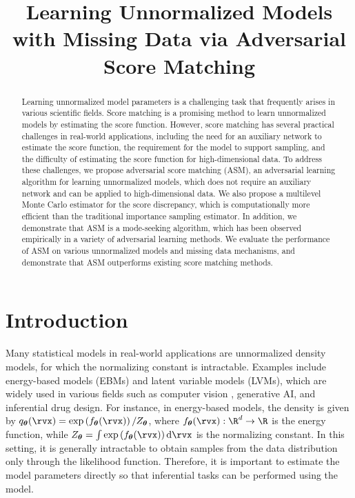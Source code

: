 \documentclass{article} %
\title{Learning Unnormalized Models with Missing Data via Adversarial Score Matching}
\begin{document}
\maketitle

\begin{abstract}
Learning unnormalized model parameters is a challenging task that frequently arises in various scientific fields. Score matching is a promising method to learn unnormalized models by estimating the score function. However, score matching has several practical challenges in real-world applications, including the need for an auxiliary network to estimate the score function, the requirement for the model to support sampling, and the difficulty of estimating the score function for high-dimensional data. To address these challenges, we propose adversarial score matching (ASM), an adversarial learning algorithm for learning unnormalized models, which does not require an auxiliary network and can be applied to high-dimensional data. We also propose a multilevel Monte Carlo estimator for the score discrepancy, which is computationally more efficient than the traditional importance sampling estimator. In addition, we demonstrate that ASM is a mode-seeking algorithm, which has been observed empirically in a variety of adversarial learning methods. We evaluate the performance of ASM on various unnormalized models and missing data mechanisms, and demonstrate that ASM outperforms existing score matching methods.
\end{abstract}

\section{Introduction}



Many statistical models in real-world applications are unnormalized density models, for which the normalizing constant is intractable. Examples include energy-based models (EBMs) and latent variable models (LVMs), which are widely used in various fields such as computer vision \citep{Salimans2021}, generative AI, and inferential drug design. For instance, in energy-based models, the density is given by $q_{\bm{\theta}}(\rvx)=\exp\left(f_{\bm{\theta}}(\rvx)\right)/Z_{\bm{\theta}}$, where $f_{\bm{\theta}}(\rvx): \R^d \to \R$ is the energy function, while $Z_{\bm{\theta}}=\int \exp\left(f_{\bm{\theta}}(\rvx)\right) \mathrm{d} \rvx$ is the normalizing constant. In this setting, it is generally intractable to obtain samples from the data distribution only through the likelihood function. Therefore, it is important to estimate the model parameters directly so that inferential tasks can be performed using the model. 
\end{document}
